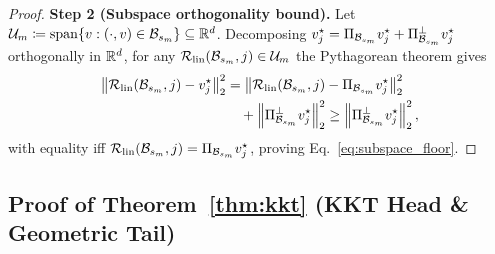 \begin{proof}
\textbf{Step 2 (Subspace orthogonality bound).}
Let $\mathcal{U}_m \coloneqq \mathrm{span}\{v : (\cdot, v) \in \mathcal{B}_{s_m}\} \subseteq \mathbb{R}^d$. Decomposing $v_j^\star = \Pi_{\mathcal{B}_{s_m}} v_j^\star + \Pi_{\mathcal{B}_{s_m}}^\perp v_j^\star$ orthogonally in $\mathbb{R}^d$, for any $\mathcal{R}_{\mathrm{lin}}(\mathcal{B}_{s_m}, j) \in \mathcal{U}_m$ the Pythagorean theorem gives
\begin{equation}
\begin{aligned}
\left\lVert \mathcal{R}_{\mathrm{lin}}(\mathcal{B}_{s_m}, j) - v_j^\star \right\rVert_2^2 &= \left\lVert \mathcal{R}_{\mathrm{lin}}(\mathcal{B}_{s_m}, j) - \Pi_{\mathcal{B}_{s_m}} v_j^\star \right\rVert_2^2 \\
&\quad + \left\lVert \Pi_{\mathcal{B}_{s_m}}^\perp v_j^\star \right\rVert_2^2 \ge \left\lVert \Pi_{\mathcal{B}_{s_m}}^\perp v_j^\star \right\rVert_2^2,
\end{aligned}
\end{equation}
with equality iff $\mathcal{R}_{\mathrm{lin}}(\mathcal{B}_{s_m}, j) = \Pi_{\mathcal{B}_{s_m}} v_j^\star$, proving Eq.~\eqref{eq:subspace_floor}.
\end{proof}

\subsection{Proof of Theorem~\ref{thm:kkt} (KKT Head \& Geometric Tail)}
\label{app:proof_thm1}

